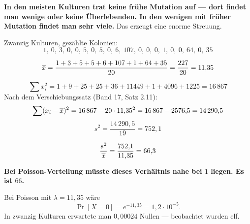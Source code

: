 \begin{merksatz}
\begin{center}
\begin{minipage}{0.9\textwidth}
\textbf{In den meisten Kulturen trat keine frühe Mutation auf --- dort findet man wenige oder keine Überlebenden. In den wenigen mit früher Mutation findet man sehr viele.} Das erzeugt eine enorme Streuung.
\end{minipage}
\end{center}
\end{merksatz}

\begin{merksatz}
Zwanzig Kulturen, gezählte Kolonien:
\[ 1,\ 0,\ 3,\ 0,\ 0,\ 5,\ 0,\ 5,\ 0,\ 6,\ 107,\ 0,\ 0,\ 0,\ 1,\ 0,\ 0,\ 64,\ 0,\ 35 \]

\[ \overline{x} = \frac{1+3+5+5+6+107+1+64+35}{20} = \frac{227}{20} = 11{,}35 \]

\[ \sum x_i^2 = 1+9+25+25+36+11449+1+4096+1225 = 16\,867 \]
Nach dem Verschiebungssatz (Band 17, Satz 2.11):
\[ \sum(x_i-\overline{x})^2 = 16\,867 - 20 \cdot 11{,}35^2 = 16\,867 - 2576{,}5 = 14\,290{,}5 \]
\[ s^2 = \frac{14\,290{,}5}{19} = 752{,}1 \]

\[ \frac{s^2}{\overline{x}} = \frac{752{,}1}{11{,}35} = 66{,}3 \]

\begin{center}
\begin{minipage}{0.9\textwidth}
\textbf{Bei Poisson-Verteilung müsste dieses Verhältnis nahe bei $1$ liegen. Es ist $66$.}
\end{minipage}
\end{center}

\begin{center}
\begin{minipage}{0.88\textwidth}
\end{minipage}
\end{center}

Bei Poisson mit $\lambda = 11{,}35$ wäre
\[ \Pr[X = 0] = e^{-11{,}35} = 1{,}2\cdot10^{-5} . \]
In zwanzig Kulturen erwartete man $0{,}00024$ Nullen --- beobachtet wurden elf.

\begin{center}
\begin{minipage}{0.88\textwidth}
\end{minipage}
\end{center}
\end{merksatz}

